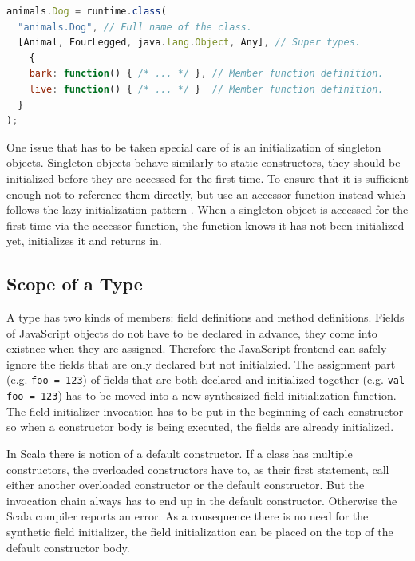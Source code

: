 \documentclass[12pt,a4paper]{report}
\begin{document}
\begin{minipage}{\linewidth}
\begin{lstlisting}[language=JavaScript,caption={The \texttt{Dog} class encoded using the \texttt{runtime.class} function},label={lst:JavaScriptClassEncoding}]
animals.Dog = runtime.class(
  "animals.Dog", // Full name of the class.                              
  [Animal, FourLegged, java.lang.Object, Any], // Super types.
	{
    bark: function() { /* ... */ }, // Member function definition.
    live: function() { /* ... */ }  // Member function definition.
  }
);
\end{lstlisting}
\end{minipage}

One issue that has to be taken special care of is an initialization of singleton objects. Singleton objects behave similarly to static constructors, they should be initialized before they are accessed for the first time. To ensure that it is sufficient enough not to reference them directly, but use an accessor function instead which follows the lazy initialization pattern \cite{Lazy}. When a singleton object is accessed for the first time via the accessor function, the function knows it has not been initialized yet, initializes it and returns in.

\subsection{Scope of a Type}

A type has two kinds of members: field definitions and method definitions. Fields of JavaScript objects do not have to be declared in advance, they come into existnce when they are assigned. Therefore the JavaScript frontend can safely ignore the fields that are only declared but not initialzied. The assignment part (e.g. \texttt{foo = 123}) of fields that are both declared and initialized together (e.g. \texttt{val foo = 123}) has to be moved into a new synthesized field initialization function. The field initializer invocation has to be put in the beginning of each constructor so when a constructor body is being executed, the fields are already initialized.

In Scala there is notion of a default constructor. If a class has multiple constructors, the overloaded constructors have to, as their first statement, call either another overloaded constructor or the default constructor. But the invocation chain always has to end up in the default constructor. Otherwise the Scala compiler reports an error. As a consequence there is no need for the synthetic field initializer, the field initialization can be placed on the top of the default constructor body.
\end{document}
